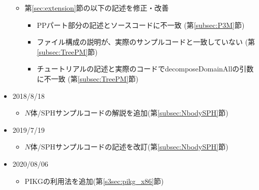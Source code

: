 \begin{itemize}
\begin{itemize}
\begin{itemize}
    \end{itemize}
  \item 第\ref{sec:extension}節の以下の記述を修正・改善
    \begin{itemize}
    \item PPパート部分の記述とソースコードに不一致 (第\ref{subsec:P3M}節)
    \item ファイル構成の説明が、実際のサンプルコードと一致していない (第\ref{subsec:TreePM}節)
    \item チュートリアルの記述と実際のコードでdecomposeDomainAllの引数に不一致 (第\ref{subsec:TreePM}節)
    \end{itemize}
  \end{itemize}
\item 2018/8/18
  \begin{itemize}
  \item $N$体/SPHサンプルコードの解説を追加(第\ref{subsec:NbodySPH}節)
  \end{itemize}
  
\item 2019/7/19
  \begin{itemize}
  \item $N$体/SPHサンプルコードの記述を改訂(第\ref{subsec:NbodySPH}節)
  \end{itemize}
\item 2020/08/06
  \begin{itemize}
  \item PIKGの利用法を追加(第\ref{s3sec:pikg_x86}節)
  \end{itemize}
\end{itemize}

